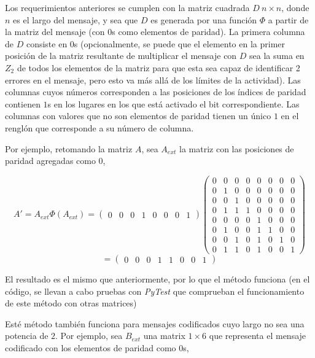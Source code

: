 \documentclass{article}
\begin{document}
Los requerimientos anteriores se cumplen con la matriz cuadrada $D\ n \times n$, donde $n$ es el largo del mensaje, y sea que $D$ es generada por una función $\Phi$ a partir de la matriz del mensaje (con $0$s como elementos de paridad). La primera columna de $D$ consiste en $0$s (opcionalmente, se puede que el elemento en la primer posición de la matriz resultante de multiplicar el mensaje con $D$ sea la suma en $Z_2$ de todos los elementos de la matriz para que esta sea capaz de identificar 2 errores en el mensaje, pero esto va más allá de los límites de la actividad). Las columnas cuyos números corresponden a las posiciones de los índices de paridad contienen $1$s en los lugares en los que está activado el bit correspondiente. Las columnas con valores que no son elementos de paridad tienen un único $1$ en el renglón que corresponde a su número de columna.

Por ejemplo, retomando la matriz $A$, sea $A_{ext}$ la matriz con las posiciones de paridad agregadas como $0$,

$$
A' = A_{ext} \Phi(A_{ext}) = \begin{pmatrix}
    0 & 0 & 0 & 1 & 0 & 0 & 0 & 1
\end{pmatrix}
\begin{pmatrix}
    0 & 0 & 0 & 0 & 0 & 0 & 0 & 0 \\
    0 & 1 & 0 & 0 & 0 & 0 & 0 & 0 \\
    0 & 0 & 1 & 0 & 0 & 0 & 0 & 0 \\
    0 & 1 & 1 & 1 & 0 & 0 & 0 & 0 \\
    0 & 0 & 0 & 0 & 1 & 0 & 0 & 0 \\
    0 & 1 & 0 & 0 & 1 & 1 & 0 & 0 \\
    0 & 0 & 1 & 0 & 1 & 0 & 1 & 0 \\
    0 & 1 & 1 & 0 & 1 & 0 & 0 & 1
\end{pmatrix}
$$$$
= \begin{pmatrix}
    0 & 0 & 0 & 1 & 1 & 0 & 0 & 1
\end{pmatrix}
$$

El resultado es el mismo que anteriormente, por lo que el método funciona (en el código, se llevan a cabo pruebas con \textit{PyTest} que comprueban el funcionamiento de este método con otras matrices)

Esté método también funciona para mensajes codificados cuyo largo no sea una potencia de $2$. Por ejemplo, sea $B_{ext}$ una matrix $1 \times 6$ que representa el mensaje codificado con los elementos de paridad como $0$s,
\end{document}
